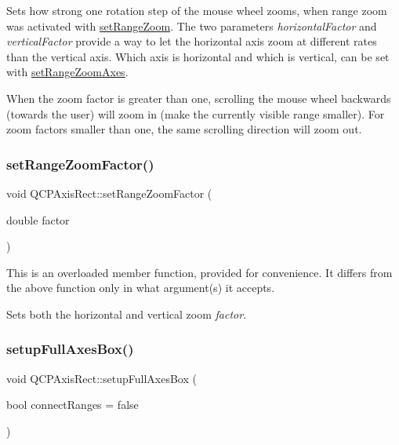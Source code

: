 Sets how strong one rotation step of the mouse wheel zooms, when range zoom was activated with \hyperlink{classQCPAxisRect_a7960a9d222f1c31d558b064b60f86a31}{set\+Range\+Zoom}. The two parameters {\itshape horizontal\+Factor} and {\itshape vertical\+Factor} provide a way to let the horizontal axis zoom at different rates than the vertical axis. Which axis is horizontal and which is vertical, can be set with \hyperlink{classQCPAxisRect_a9442cca2aa358405f39a64d51eca13d2}{set\+Range\+Zoom\+Axes}.

When the zoom factor is greater than one, scrolling the mouse wheel backwards (towards the user) will zoom in (make the currently visible range smaller). For zoom factors smaller than one, the same scrolling direction will zoom out. \mbox{\label{classQCPAxisRect_ae83d187b03fc6fa4f00765ad50cd3fc3}} 
\subsubsection{\texorpdfstring{set\+Range\+Zoom\+Factor()}{setRangeZoomFactor()}\hspace{0.1cm}{\footnotesize\ttfamily [2/2]}}
{\footnotesize\ttfamily void Q\+C\+P\+Axis\+Rect\+::set\+Range\+Zoom\+Factor (\begin{DoxyParamCaption}\item[{double}]{factor }\end{DoxyParamCaption})}

This is an overloaded member function, provided for convenience. It differs from the above function only in what argument(s) it accepts.

Sets both the horizontal and vertical zoom {\itshape factor}. \mbox{\label{classQCPAxisRect_a5fa906175447b14206954f77fc7f1ef4}} 
\subsubsection{\texorpdfstring{setup\+Full\+Axes\+Box()}{setupFullAxesBox()}}
{\footnotesize\ttfamily void Q\+C\+P\+Axis\+Rect\+::setup\+Full\+Axes\+Box (\begin{DoxyParamCaption}\item[{bool}]{connect\+Ranges = {\ttfamily false} }\end{DoxyParamCaption})}

